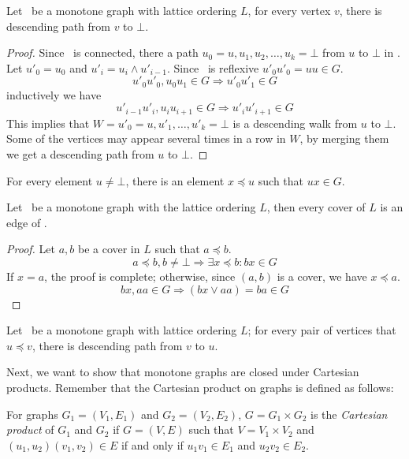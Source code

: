 \begin{lemma}
Let \mG\ be a monotone graph with lattice ordering \(L\),
for every vertex \(v\), there is descending path from
\(v\) to \(\bot\)\@.
\end{lemma}

\begin{proof}
Since \mG\ is connected, there a path \(u_0=u,u_1,u_2,\dotsc,u_k=\bot\) from \(u\) to 
\(\bot\) in \mG\@. Let \(u'_0=u_0\) and \(u'_i = u_i\wedge u'_{i-1}\)\@.
Since \mG\ is reflexive \(u'_0u'_0=uu \in G\)\@.
\[u'_0u'_0, u_0u_1 \in G \Rightarrow u'_0u'_1 \in G\]
inductively we have
\[u'_{i-1}u'_i, u_iu_{i+1} \in G \Rightarrow u'_iu'_{i+1} \in G\]
This implies that \(W=u'_0=u,u'_1,\dotsc,u'_k=\bot\) is a descending walk from 
\(u\) to \(\bot\)\@. Some of the vertices may appear several times in a row in \(W\),
by merging them we get a descending path from \(u\) to \(\bot\)\@.
\end{proof}

\begin{cor}
For every element \(u \neq \bot\),
there is an element \(x \preceq u\) such that \(ux \in G\)\@.
\end{cor}

\begin{lemma}
Let \mG\ be a monotone graph with the lattice ordering \(L\), then every cover
of \(L\) is an edge of \mG\@.
\end{lemma}

\begin{proof}
Let \(a,b\) be a cover in \(L\) such that \(a \preceq b\)\@.
\[a \preceq b, b\neq \bot \Rightarrow \exists x \preceq b: bx \in G\]
If \(x=a\), the proof is complete; otherwise, since \((a,b)\) is a cover, we have \(x\preceq a\).
\[bx,aa \in G \Rightarrow (bx \vee aa) = ba \in G\]\@
\end{proof}

\begin{cor}
Let \mG\ be a monotone graph with lattice ordering \(L\);
for every pair of vertices that \(u\preceq v\), there is descending path from
\(v\) to \(u\)\@. 
\end{cor}

Next, we want to show that monotone graphs are closed under Cartesian products.
Remember that the Cartesian product on graphs is defined as follows:
\begin{defi} 
For graphs \(G_1=(V_1,E_1)\) and \(G_2=(V_2,E_2)\), \(G = G_1 \times G_2\)
is the \emph{Cartesian product} of \(G_1\) and \(G_2\) if \(G=(V,E)\)
such that \(V=V_1 \times V_2\) and \((u_1,u_2)(v_1,v_2) \in E\)
if and only if \(u_1v_1 \in E_1\) and \(u_2v_2 \in E_2\)\@.
\end{defi}

